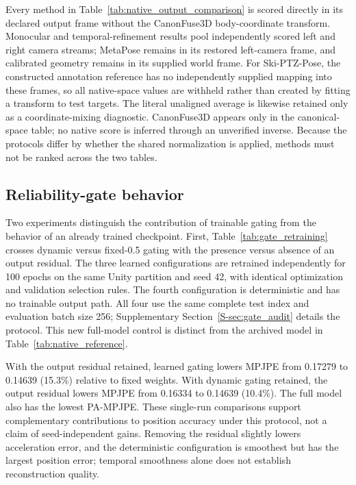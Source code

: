 \documentclass[preprint,12pt]{elsarticle}
\begin{document}
Every method in Table~\ref{tab:native_output_comparison} is scored directly in its declared output frame without the CanonFuse3D body-coordinate transform. Monocular and temporal-refinement results pool independently scored left and right camera streams; MetaPose remains in its restored left-camera frame, and calibrated geometry remains in its supplied world frame. For Ski-PTZ-Pose, the constructed annotation reference has no independently supplied mapping into these frames, so all native-space values are withheld rather than created by fitting a transform to test targets. The literal unaligned average is likewise retained only as a coordinate-mixing diagnostic. CanonFuse3D appears only in the canonical-space table; no native score is inferred through an unverified inverse. Because the protocols differ by whether the shared normalization is applied, methods must not be ranked across the two tables.

\FloatBarrier
\subsection{Reliability-gate behavior}

Two experiments distinguish the contribution of trainable gating from the behavior of an already trained checkpoint. First, Table~\ref{tab:gate_retraining} crosses dynamic versus fixed-0.5 gating with the presence versus absence of an output residual. The three learned configurations are retrained independently for 100 epochs on the same Unity partition and seed 42, with identical optimization and validation selection rules. The fourth configuration is deterministic and has no trainable output path. All four use the same complete test index and evaluation batch size 256; Supplementary Section~\ref{S-sec:gate_audit} details the protocol. This new full-model control is distinct from the archived model in Table~\ref{tab:native_reference}.



With the output residual retained, learned gating lowers MPJPE from 0.17279 to 0.14639 (15.3\%) relative to fixed weights. With dynamic gating retained, the output residual lowers MPJPE from 0.16334 to 0.14639 (10.4\%). The full model also has the lowest PA-MPJPE. These single-run comparisons support complementary contributions to position accuracy under this protocol, not a claim of seed-independent gains. Removing the residual slightly lowers acceleration error, and the deterministic configuration is smoothest but has the largest position error; temporal smoothness alone does not establish reconstruction quality.
\end{document}
